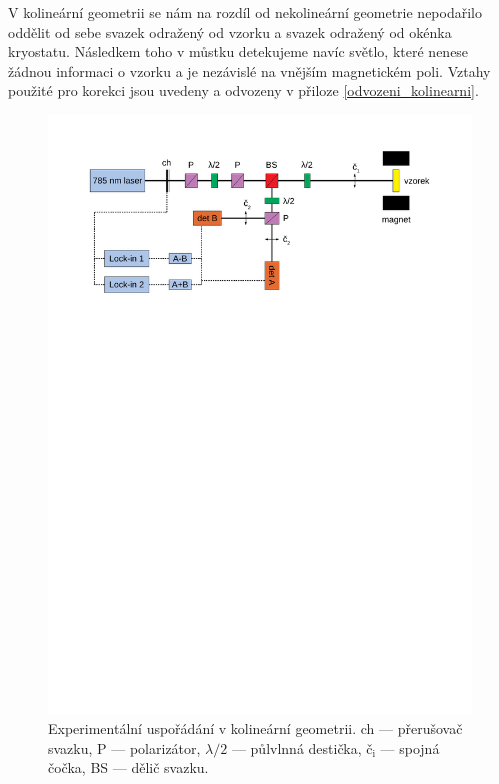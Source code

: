V kolineární geometrii se nám na rozdíl od nekolineární geometrie nepodařilo oddělit od sebe svazek odražený od vzorku a svazek odražený od okénka kryostatu. Následkem toho v můstku detekujeme navíc světlo, které nenese žádnou informaci o vzorku a je nezávislé na vnějším magnetickém poli. Vztahy použité pro korekci jsou uvedeny a odvozeny v přiloze \ref{odvozeni_kolinearni}.


\begin{figure}[htbp]\centering
	\includegraphics[trim={0,7in 8in 0,7in 0.5in}, clip, width=\textwidth]{./png/kolinearni_usporadani}
	\caption{Experimentální uspořádání v kolineární geometrii. ch --- přerušovač svazku, P --- polarizátor, $\lambda/2$ --- půlvlnná destička, č$_\text{i}$ --- spojná čočka, BS --- dělič svazku.}\label{kolinearni_usporadani}
\end{figure}

\FloatBarrier

